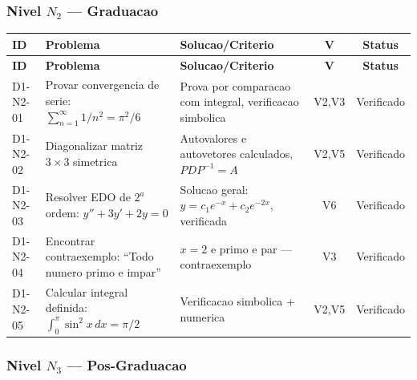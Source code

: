 \subsubsection{Nivel $N_2$ --- Graduacao}

\begin{longtable}{|p{2.0cm}|p{4.2cm}|p{4.2cm}|c|c|}
\hline
\textbf{ID} & \textbf{Problema} & \textbf{Solucao/Criterio} & \textbf{V} & \textbf{Status} \\
\hline
\endfirsthead
\hline
\textbf{ID} & \textbf{Problema} & \textbf{Solucao/Criterio} & \textbf{V} & \textbf{Status} \\
\hline
\endhead
\hline
\endfoot
D1-N2-01 & Provar convergencia de serie: $\sum_{n=1}^{\infty}1/n^{2}=\pi^{2}/6$ & Prova por comparacao com integral, verificacao simbolica & V2,V3 & Verificado \\
\hline
D1-N2-02 & Diagonalizar matriz $3\times 3$ simetrica & Autovalores e autovetores calculados, $PDP^{-1}=A$ & V2,V5 & Verificado \\
\hline
D1-N2-03 & Resolver EDO de $2^{a}$ ordem: $y''+3y'+2y=0$ & Solucao geral: $y=c_{1}e^{-x}+c_{2}e^{-2x}$, verificada & V6 & Verificado \\
\hline
D1-N2-04 & Encontrar contraexemplo: ``Todo numero primo e impar'' & $x=2$ e primo e par --- contraexemplo & V3 & Verificado \\
\hline
D1-N2-05 & Calcular integral definida: $\int_{0}^{\pi}\sin^{2}x\,dx=\pi/2$ & Verificacao simbolica + numerica & V2,V5 & Verificado \\
\hline
\end{longtable}

\subsubsection{Nivel $N_3$ --- Pos-Graduacao}

